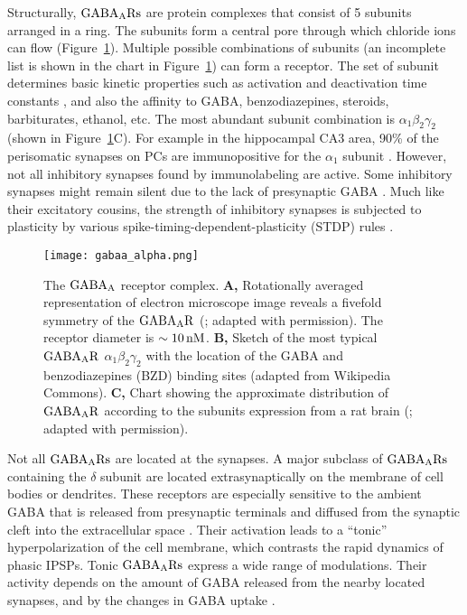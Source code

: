       Structurally, $\rm GABA_ARs$ are protein complexes that consist of 5
      subunits arranged in a ring. The subunits form a central pore through
      which chloride ions can flow (Figure~\ref{fig:gabaa}). Multiple possible
      combinations of subunits (an incomplete list is shown in the chart in
      Figure~\ref{fig:gabaa}) can form a receptor. The set of subunit
      determines basic kinetic properties such as activation and deactivation
      time constants \citep{Benkwitz2004, Boileau2005}, and also the affinity
      to GABA, benzodiazepines, steroids, barbiturates, ethanol, etc. The most
      abundant subunit combination is $\alpha_1 \beta_2 \gamma_2$ (shown in
      Figure~\ref{fig:gabaa}C). For example in the hippocampal CA3 area, 90\%
      of the perisomatic synapses on PCs are immunopositive for the $\alpha_1$
      subunit \citep{Kerti2016}. However, not all inhibitory synapses found by
      immunolabeling are active. Some inhibitory synapses might remain silent
      due to the lack of presynaptic GABA \citep{Bekkers2005}. Much like their
      excitatory cousins, the strength of inhibitory synapses is subjected to
      plasticity by various spike-timing-dependent-plasticity (STDP) rules
      \citep[as reviewed by][]{Vogels2013}.

      \begin{figure}
        \center
        \texttt{[image: gabaa\_alpha.png]}
        \caption{
          The $\rm GABA_A$ receptor complex.
          {\bf A,} Rotationally averaged representation of electron microscope
          image reveals a fivefold symmetry of the $\rm GABA_AR$
          (\citealp{Nayeem1994}; adapted with permission). The receptor
          diameter is $\sim 10\,\rm nM$.
          {\bf B,} Sketch of the most typical $\rm GABA_AR$ $\alpha_1
          \beta_2 \gamma_2$ with the location of the GABA and benzodiazepines
          (BZD) binding sites (adapted from Wikipedia Commons).
          {\bf C,} Chart showing the approximate distribution of $\rm
          GABA_AR$ according to the subunits expression from a rat brain
          (\citealp{Whiting2003}; adapted with permission).
               }
      \label{fig:gabaa}
      \end{figure}
      
      Not all $\rm GABA_ARs$ are located at the synapses. A major subclass of
      $\rm GABA_ARs$ containing the $\delta$ subunit are located
      extrasynaptically on the membrane of cell bodies or dendrites. These
      receptors are especially sensitive to the ambient GABA that is released
      from presynaptic terminals and diffused from the synaptic cleft into the
      extracellular space \citep{Semyanov2004, Farrant2005}. Their activation
      leads to a ``tonic'' hyperpolarization of the cell membrane, which
      contrasts the rapid dynamics of phasic IPSPs. Tonic $\rm GABA_A Rs$
      express a wide range of modulations. Their activity depends on the amount
      of GABA released from the nearby located synapses, and by the changes in
      GABA uptake \citep{Farrant2005}.

